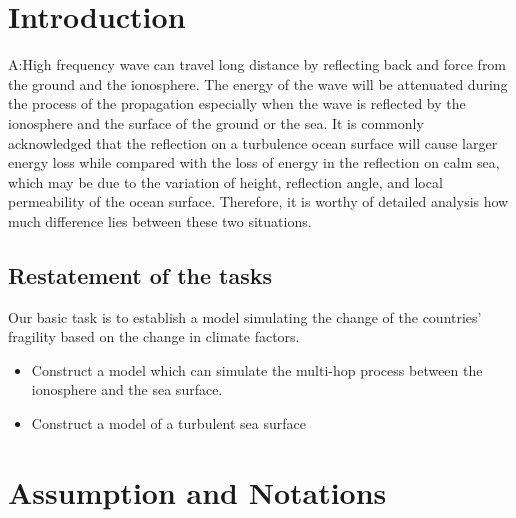 \documentclass[a4paper]{article}
\begin{document}
%	
	\newpage
	\tableofcontents
	\newpage
\section{Introduction}
A:High frequency wave can travel long distance by reflecting back and force from the ground and the ionosphere. The energy of the wave will be attenuated during the process of the propagation especially when the wave is reflected by the ionosphere and the surface of the ground or the sea. It is commonly acknowledged that the reflection on a turbulence ocean surface will cause larger energy loss while compared with the loss of energy in the reflection on calm sea, which may be due to the variation of height, reflection angle, and local permeability of the ocean surface. Therefore, it is worthy of detailed analysis how much difference lies between these two situations.

	\subsection{Restatement of the tasks}
	Our basic task is to establish a model simulating the change of the countries' fragility based on the change in climate factors.
	\begin{itemize}
	\item 
	Construct a model which can simulate the multi-hop process between the ionosphere and the sea surface.
	\item
	Construct a model of a turbulent sea surface
	\end{itemize}
	
	
\section{Assumption and Notations}
\end{document}

